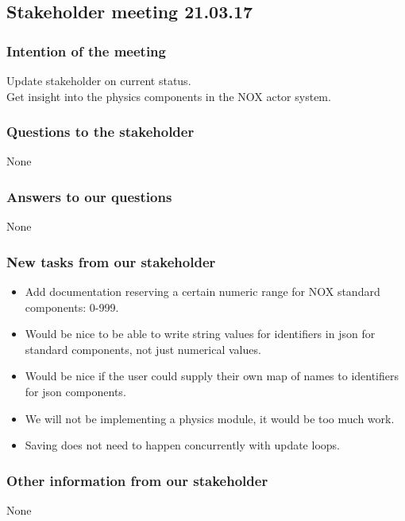 \documentclass{article}
\begin{document}
\begin{center}
\subsection*{Stakeholder meeting 21.03.17}
\end{center}

\bigskip


\subsubsection*{Intention of the meeting}
Update stakeholder on current status.\\
Get insight into the physics components in the NOX actor system.


\subsubsection*{Questions to the stakeholder}
None

\subsubsection*{Answers to our questions}
None

\subsubsection*{New tasks from our stakeholder}
\begin{itemize}
    \item
    Add documentation reserving a certain numeric range for NOX standard components: 0-999.
    
    \item    
    Would be nice to be able to write string values for identifiers in json for standard components, not just numerical values.

    \item
    Would be nice if the user could supply their own map of names to identifiers for json components.

    \item
    We will not be implementing a physics module, it would be too much work.
    
    \item
    Saving does not need to happen concurrently with update loops.
\end{itemize}

\subsubsection*{Other information from our stakeholder}
None
\end{document}
